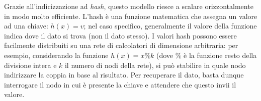 \documentclass[a4page, 11pt]{article}
\begin{document}
Grazie all'indicizzazione ad \textit{hash}, questo modello riesce a scalare orizzontalmente in modo molto efficiente.
L'hash è una funzione matematica che assegna un valore ad una chiave: $h(x) = v$; nel caso specifico, generalmente il valore della funzione indica dove il dato si trova (non il dato stesso). I valori hash possono essere facilmente distribuiti su una rete di calcolatori di dimensione arbitraria: per esempio, considerando la funzione $h(x) = x \% k$ (dove $\%$ è la funzione resto della divisione intera e $k$ il numero di nodi della rete), si può stabilire in quale nodo indirizzare la coppia in base al risultato.
Per recuperare il dato, basta dunque interrogare il nodo in cui è presente la chiave e attendere che questo invii il valore.


\newpage
\printbibliography[title={Letture di approfondimento}]
\end{document}
